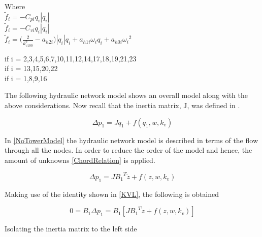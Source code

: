 \begin{minipage}[t]{0.20\textwidth}
Where\\
\hspace*{2mm} $\tilde{f}_i = -C_{pi} q_i |q_i|$  \\
\hspace*{2mm} $\tilde{f}_i = -C_{vi} q_i |q_i|$  \\
\hspace*{2mm} $\tilde{f}_i = \Big(\frac{2}{k_{v100}^2} - a_{h2i}\Big)|q_i| q_i  + a_{h1i} \omega_{i} q_i + a_{h0i}{\omega_i}^2$  
\end{minipage}
\begin{minipage}[t]{0.68\textwidth}
\vspace*{2mm}
\hspace*{25mm} if i = 2,3,4,5,6,7,10,11,12,14,17,18,19,21,23\\
\hspace*{25mm} if i = 13,15,20,22						   \\
\hspace*{65mm} if i = 1,8,9,16						   
\end{minipage}


The following hydraulic network model shows an overall model along with the above considerations. 
Now recall that the inertia matrix, J, was defined in .

\begin{equation}
  \Delta p_1 = J \dot{q}_1 + f(q_1, w, k_v)
  \label{NoTowerModel}
\end{equation}

In \eqref{NoTowerModel} the hydraulic network model is described in terms of the 
flow through all the nodes. In order to reduce the order of the model and hence, 
the amount of unknowns \eqref{ChordRelation} is applied. 

\begin{equation}
  \Delta p_1 = J {B_1}^T \dot{z} + f(z, w, k_v)
  \label{ChordsModel}
\end{equation}

Making use of the identity shown in \eqref{KVL}, the following is obtained

\begin{equation}
  0 = B_1 \Delta p_1 = B_1 [J {B_1}^T \dot{z} + f(z, w, k_v)] 
 \end{equation}

Isolating the inertia matrix to the left side

